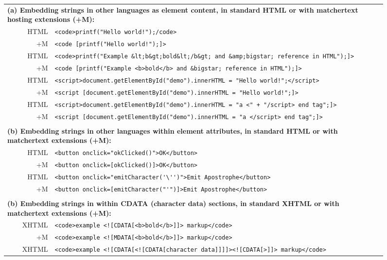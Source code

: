 \begin{figure*}
\begin{center}
\begin{footnotesize}
\begin{tabular}{lrl}
\multicolumn{3}{l}{\textbf{(a) Embedding strings in other languages as element content, in standard HTML or with matchertext hosting extensions (+M):}} \\
& HTML	& \verb|<code>printf("Hello world!");/code>| \\
& +M	& \verb|<code [printf("Hello world!");]>| \\
& HTML	& \verb|<code>printf("Example &lt;b&gt;bold&lt;/b&gt; and &amp;bigstar; reference in HTML");]>| \\
& +M	& \verb|<code [printf("Example <b>bold</b> and &bigstar; reference in HTML");]>| \\
& HTML	& \verb|<script>document.getElementById("demo").innerHTML = "Hello world!";</script>| \\
& +M	& \verb|<script [document.getElementById("demo").innerHTML = "Hello world!";]>| \\
& HTML	& \verb|<script>document.getElementById("demo").innerHTML = "a <" + "/script> end tag";]>| \\
& +M	& \verb|<script [document.getElementById("demo").innerHTML = "a </script> end tag";]>| \\
\\
\multicolumn{3}{l}{\textbf{(b) Embedding strings in other languages within element attributes, in standard HTML or with matchertext extensions (+M):}} \\
& HTML	& \verb|<button onclick="okClicked()">OK</button>| \\
& +M	& \verb|<button onclick=[okClicked()]>OK</button>| \\
& HTML	& \verb|<button onclick="emitCharacter('\'')">Emit Apostrophe</button>| \\
& +M	& \verb|<button onclick=[emitCharacter("'")]>Emit Apostrophe</button>| \\
\\
\multicolumn{3}{l}{\textbf{(b) Embedding strings in within CDATA (character data) sections, in standard XHTML or with matchertext extensions (+M):}} \\
& XHTML	& \verb|<code>example <![CDATA[<b>bold</b>]]> markup</code>| \\
& +M	& \verb|<code>example <![MDATA[<b>bold</b>]]> markup</code>| \\
& XHTML	& \verb|<code>example <![CDATA[<![CDATA[character data]]]]><![CDATA[>]]> markup</code>| \\

\end{tabular}
\end{footnotesize}
\end{center}
\end{figure*}

